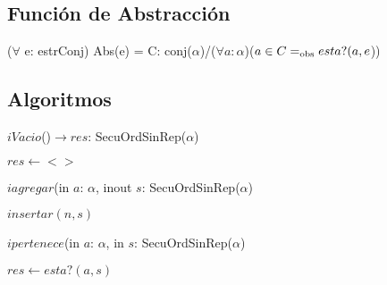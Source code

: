 \subsection*{Funci\'on de Abstracci\'on}
\vspace{11pt}
($\forall$ e: estrConj) Abs(e) = C: conj($\alpha$)/($\forall a:\alpha$)($a\in C=_{\mathrm{obs}} esta?(a,{e}$))
\vspace{33pt}


\subsection*{Algoritmos}

$\textit{i}Vacio$()$\longrightarrow res$: SecuOrdSinRep($\alpha$)\\
\begin{algorithm}[H]
$res\leftarrow <>$
\end{algorithm}

$\textit{i}agregar$(in $a$: $\alpha$, inout $s$: SecuOrdSinRep($\alpha$)\\
\begin{algorithm}[H]
$insertar(n,s)$
\end{algorithm}

$ipertenece$(in $a$: $\alpha$, in $s$: SecuOrdSinRep($\alpha$)\\
\begin{algorithm}[H]
$res\leftarrow esta?(a,s)$
\end{algorithm}